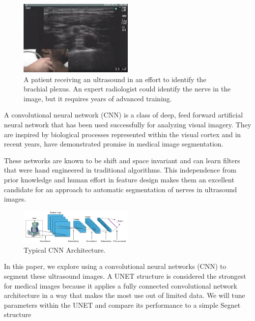 \documentclass[letterpaper]{article}
\begin{document}
 \begin{figure}[H]
  \centerline{\includegraphics[width=0.5\textwidth]{Images/UltrasoundNerve.png}}
  \caption{A patient receiving an ultrasound in an effort to identify the brachial plexus. An expert radiologist could identify the nerve in the image, but it requires years of advanced training.}
  \label{fig:cnnarchitecture}
\end{figure}

A convolutional neural network (CNN) is a class of deep, feed forward artificial neural network that has been used successfully for analyzing visual imagery. They are inspired by biological processes represented within the visual cortex and in recent years, have demonstrated promise in medical image segmentation. 

These networks are known to be shift and space invariant and can learn filters that were hand engineered in traditional algorithms. This independence from prior knowledge and human effort in feature design makes them an excellent candidate for an approach to automatic segmentation of nerves in ultrasound images. 

 \begin{figure}[H]
  \centerline{\includegraphics[width=0.5\textwidth]{Images/TypicalCNN.png}}
  \caption{Typical CNN Architecture.}
  \label{fig:cnnarchitecture}
\end{figure}

In this paper, we explore using a convolutional neural networks (CNN) to segment these ultrasound images. A UNET structure is considered the strongest for medical images because it applies a fully connected convolutional network architecture in a way that makes the most use out of limited data.\cite{ronneberger2015u} We will tune parameters within the UNET and compare its  performance to a simple Segnet structure 
\end{document}
